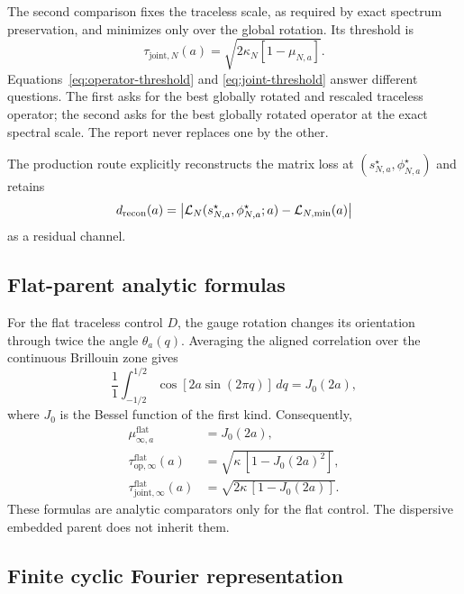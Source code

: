 The second comparison fixes the traceless scale, as required by exact spectrum
preservation, and minimizes only over the global rotation.  Its threshold is
\begin{equation}
 \tau_{\mathrm{joint},N}(a)
 =\sqrt{2\kappa_N[1-\mu_{N,a}]}.
 \label{eq:joint-threshold}
\end{equation}
Equations~\eqref{eq:operator-threshold} and \eqref{eq:joint-threshold} answer different
questions.  The first asks for the best globally rotated and rescaled traceless operator;
the second asks for the best globally rotated operator at the exact spectral scale.  The
report never replaces one by the other.

The production route explicitly reconstructs the matrix loss at
$(s_{N,a}^{\star},\phi_{N,a}^{\star})$ and retains
\begin{equation}
 d_{\mathrm{recon}}(a)
 =\left\lvert \mathcal L_N(s_{N,a}^{\star},\phi_{N,a}^{\star};a)
       -\mathcal L_{N,\min}(a)\right\rvert
 \label{eq:loss-reconstruction-defect}
\end{equation}
as a residual channel.

\subsection{Flat-parent analytic formulas}

For the flat traceless control $D$, the gauge rotation changes its orientation through
twice the angle $\theta_a(q)$.  Averaging the aligned correlation over the continuous
Brillouin zone gives
\begin{equation}
 \frac{1}{1}\int_{-1/2}^{1/2}\cos[2a\sin(2\pi q)]\,dq
 =J_0(2a),
 \label{eq:bessel-correlation}
\end{equation}
where $J_0$ is the Bessel function of the first kind.  Consequently,
\begin{align}
 \mu_{\infty,a}^{\mathrm{flat}}&=J_0(2a),\\
 \tau_{\mathrm{op},\infty}^{\mathrm{flat}}(a)
 &=\sqrt{\kappa\,[1-J_0(2a)^2]},\\
 \tau_{\mathrm{joint},\infty}^{\mathrm{flat}}(a)
 &=\sqrt{2\kappa\,[1-J_0(2a)]}.
 \label{eq:flat-thresholds}
\end{align}
These formulas are analytic comparators only for the flat control.  The dispersive
embedded parent does not inherit them.

\subsection{Finite cyclic Fourier representation}

